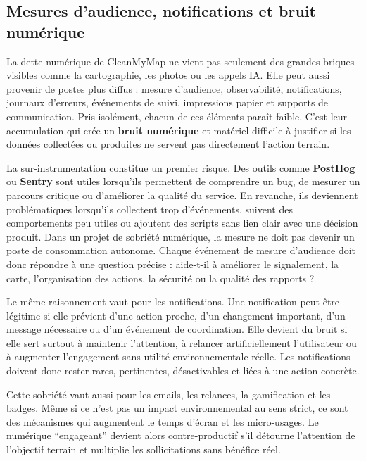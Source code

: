 \documentclass[
  10pt,
  a4paper,
  DIV=11,
  numbers=noendperiod,
  oneside]{scrreprt}
\let\oldtextbf\textbf
\renewcommand{\textbf}[1]{\oldtextbf{\textcolor{cmmnavy}{#1}}}
\begin{document}
\subsection{Mesures d'audience, notifications et bruit
numérique}\label{mesures-daudience-notifications-et-bruit-numuxe9rique}

La dette numérique de CleanMyMap ne vient pas seulement des grandes
briques visibles comme la cartographie, les photos ou les appels IA.
Elle peut aussi provenir de postes plus diffus : mesure d'audience,
observabilité, notifications, journaux d'erreurs, événements de suivi,
impressions papier et supports de communication. Pris isolément, chacun
de ces éléments paraît faible. C'est leur accumulation qui crée un
\textbf{bruit numérique} et matériel difficile à justifier si les
données collectées ou produites ne servent pas directement l'action
terrain.

La sur-instrumentation constitue un premier risque. Des outils comme
\textbf{PostHog} ou \textbf{Sentry} sont utiles lorsqu'ils permettent de
comprendre un bug, de mesurer un parcours critique ou d'améliorer la
qualité du service. En revanche, ils deviennent problématiques
lorsqu'ils collectent trop d'événements, suivent des comportements peu
utiles ou ajoutent des scripts sans lien clair avec une décision
produit. Dans un projet de sobriété numérique, la mesure ne doit pas
devenir un poste de consommation autonome. Chaque événement de mesure
d'audience doit donc répondre à une question précise : aide-t-il à
améliorer le signalement, la carte, l'organisation des actions, la
sécurité ou la qualité des rapports ?

Le même raisonnement vaut pour les notifications. Une notification peut
être légitime si elle prévient d'une action proche, d'un changement
important, d'un message nécessaire ou d'un événement de coordination.
Elle devient du bruit si elle sert surtout à maintenir l'attention, à
relancer artificiellement l'utilisateur ou à augmenter l'engagement sans
utilité environnementale réelle. Les notifications doivent donc rester
rares, pertinentes, désactivables et liées à une action concrète.

Cette sobriété vaut aussi pour les emails, les relances, la gamification
et les badges. Même si ce n'est pas un impact environnemental au sens
strict, ce sont des mécanismes qui augmentent le temps d'écran et les
micro-usages. Le numérique ``engageant'' devient alors contre-productif
s'il détourne l'attention de l'objectif terrain et multiplie les
sollicitations sans bénéfice réel.
\end{document}

